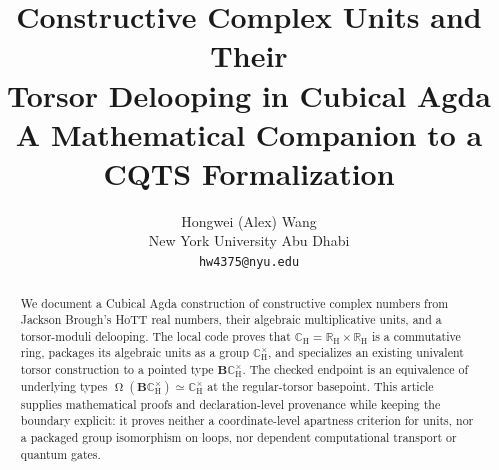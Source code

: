 \documentclass[11pt]{amsart}
\title[Constructive Complex Units and Their Torsor Delooping]{Constructive Complex Units and Their\\[0.35em]Torsor Delooping in Cubical Agda\\[0.35em]\large\textnormal{A Mathematical Companion to a CQTS Formalization}}
\author{Hongwei (Alex) Wang\\[3pt]
\small New York University Abu Dhabi\\
\small \texttt{hw4375@nyu.edu}}
\newcommand{\CH}{\mathbb{C}_{\mathrm H}}
\newcommand{\CHunits}{\mathbb{C}_{\mathrm H}^{\times}}
\newcommand{\BG}{\mathbf{B}}
\newcommand{\Loop}{\mathop{\Omega}}
\begin{document}
\begin{abstract}
We document a Cubical Agda construction of constructive complex numbers from
Jackson Brough's HoTT real numbers, their algebraic multiplicative units, and
a torsor-moduli delooping.  The local code proves that
$\CH=\mathbb{R}_{\mathrm H}\times\mathbb{R}_{\mathrm H}$ is a commutative
ring, packages its algebraic units as a group $\CHunits$, and specializes an
existing univalent torsor construction to a pointed type $\BG\CHunits$.
The checked endpoint is an equivalence of underlying types
$\Loop(\BG\CHunits)\simeq\CHunits$ at the regular-torsor basepoint.  This
article supplies mathematical proofs and declaration-level provenance while
keeping the boundary explicit: it proves neither a coordinate-level
apartness criterion for units, nor a packaged group isomorphism on loops,
nor dependent computational transport or quantum gates.
\end{abstract}
\maketitle
\pagestyle{plain}








\appendix


\end{document}
